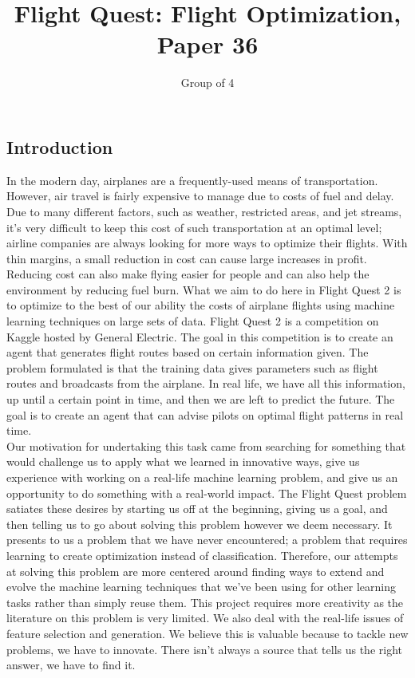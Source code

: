 \documentclass{article}[12pt]
\begin{document}
\title{Flight Quest: Flight Optimization, Paper 36}
\author{
	Group of 4
}
\date{}
\maketitle

\setlength{\columnsep}{1cm}
\begin{multicols}{2}

\section{Introduction}
In the modern day, airplanes are a frequently-used means of transportation. However, air travel is fairly expensive to manage due to costs of fuel and delay. Due to many different factors, such as weather, restricted areas, and jet streams, it's very difficult to keep this cost of such transportation at an optimal level; airline companies are always looking for more ways to optimize their flights. With thin margins, a small reduction in cost can cause large increases in profit. Reducing cost can also make flying easier for people and can also help the environment by reducing fuel burn. What we aim to do here in Flight Quest 2 is to optimize to the best of our ability the costs of airplane flights using machine learning techniques on large sets of data. Flight Quest 2 is a competition on Kaggle hosted by General Electric.  The goal in this competition is to create an agent that generates flight routes based on certain information given. The problem formulated is that the training data gives parameters such as flight routes and broadcasts from the airplane. In real life, we have all this information, up until a certain point in time, and then we are left to predict the future. The goal is to create an agent that can advise pilots on optimal flight patterns in real time.
\\
Our motivation for undertaking this task came from searching for something that would challenge us to apply what we learned in innovative ways, give us experience with working on a real-life machine learning problem, and give us an opportunity to do something with a real-world impact. The Flight Quest problem satiates these desires by starting us off at the beginning, giving us a goal, and then telling us to go about solving this problem however we deem necessary. It presents to us a problem that we have never encountered; a problem that requires learning to create optimization instead of classification. Therefore, our attempts at solving this problem are more centered around finding ways to extend and evolve the machine learning techniques that we've been using for other learning tasks rather than simply reuse them. This project requires more creativity as the literature on this problem is very limited. We also deal with the real-life issues of feature selection and generation. We believe this is valuable because to tackle new problems, we have to innovate. There isn't always a source that tells us the right answer, we have to find it.
 

\end{multicols}
\end{document}
